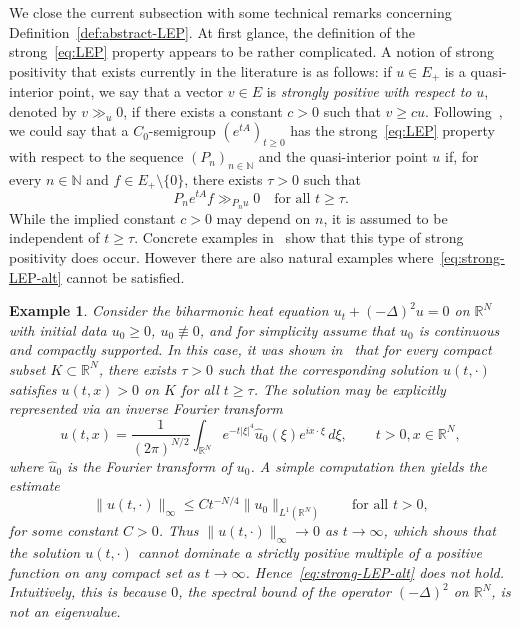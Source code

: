 \documentclass[sn-mathphys]{sn-jnl}%
\theoremstyle{thmstyleone}
\theoremstyle{thmstylethree}
\newtheorem{example}[theorem]{Example}
\newcommand{\NN}{\mathbb{N}}
\newcommand{\RR}{\mathbb{R}}
\begin{document}
We close the current subsection with some technical remarks concerning Definition~\ref{def:abstract-LEP}. At first glance, the definition of the strong~\eqref{eq:LEP} property appears to be rather complicated. A notion of strong positivity that exists currently in the literature is as follows: if $u\in E_+$ is a quasi-interior point, we say that a vector $v\in E$ is \emph{strongly positive with respect to} $u$, denoted by $v\gg_u 0$, if there exists a constant $c>0$ such that $v\ge cu$. Following~\cite[Definition 2.4]{Ar21}, we could say that a $C_0$-semigroup $(e^{tA})_{t\ge 0}$ has the strong~\eqref{eq:LEP} property with respect to the sequence $(P_n)_{n\in\NN}$ and the quasi-interior point $u$ if, for every $n\in\NN$ and $f\in E_+\setminus\{0\}$, there exists $\tau>0$ such that
\begin{equation}
	\label{eq:strong-LEP-alt}
	P_n e^{tA}f \gg_{P_n u} 0 \quad\text{for all }t\ge\tau.
\end{equation}
While the implied constant $c>0$ may depend on $n$, it is assumed to be independent of $t\ge\tau$. Concrete examples in~\cite[Section 5]{Ar21} show that this type of strong positivity does occur. However there are also natural examples where~\eqref{eq:strong-LEP-alt} cannot be satisfied.
\begin{example}
	Consider the biharmonic heat equation $u_t + (-\Delta)^2 u=0$ on $\RR^N$ with initial data $u_0\ge 0$, $u_0\not\equiv 0$, and for simplicity assume that $u_0$ is continuous and compactly supported. In this case, it was shown in~\cite{GG-lep} that for every compact subset $K\subset\RR^N$, there exists $\tau>0$ such that the corresponding solution $u(t,\cdot)$ satisfies $u(t,x)>0$ on $K$ for all $t\ge\tau$. The solution may be explicitly represented via an inverse Fourier transform
	\begin{equation*}
		u(t,x) = \frac{1}{(2\pi)^{N/2}}\int_{\RR^N} e^{-t\lvert\xi\rvert^4}\hat{u}_0(\xi)e^{ix\cdot\xi} \,d\xi, \qquad t>0, x\in\RR^N,
	\end{equation*}
	where $\hat{u}_0$ is the Fourier transform of $u_0$. A simple computation then yields the estimate
	\begin{equation*}
		\|u(t,\cdot)\|_\infty \le C t^{-N/4} \|u_0\|_{L^1(\RR^N)}\qquad\text{for all }t>0,
	\end{equation*}
	for some constant $C>0$. Thus $\|u(t,\cdot)\|_\infty \to 0$ as $t\to\infty$, which shows that the solution $u(t,\cdot)$ cannot dominate a strictly positive multiple of a positive function on any compact set as $t\to\infty$. Hence~\eqref{eq:strong-LEP-alt} does not hold. Intuitively, this is because $0$, the spectral bound of the operator $(-\Delta)^2$ on $\RR^N$, is not an eigenvalue.
\end{example}
\end{document}
